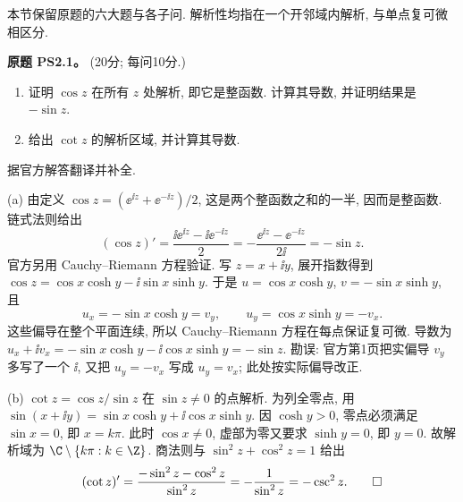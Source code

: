 本节保留原题的六大题与各子问. 解析性均指在一个开邻域内解析, 与单点复可微相区分.

\begin{exercise}\label{ass:ps2-1}
\textbf{原题 PS2.1。} (20分; 每问10分.)
\begin{enumerate}[label=(\alph*)]
\item 证明 $\cos z$ 在所有 $z$ 处解析, 即它是整函数. 计算其导数, 并证明结果是 $-\sin z$.
\item 给出 $\cot z$ 的解析区域, 并计算其导数.
\end{enumerate}
\end{exercise}
\begin{solution}
据官方解答翻译并补全.

(a) 由定义 $\cos z=(\ee^{\ii z}+\ee^{-\ii z})/2$, 这是两个整函数之和的一半, 因而是整函数. 链式法则给出
\[
 (\cos z)'=\frac{\ii\ee^{\ii z}-\ii\ee^{-\ii z}}2
 =-\frac{\ee^{\ii z}-\ee^{-\ii z}}{2\ii}=-\sin z.
\]
官方另用 Cauchy--Riemann 方程验证. 写 $z=x+\ii y$, 展开指数得到
$\cos z=\cos x\cosh y-\ii\sin x\sinh y$.
于是 $u=\cos x\cosh y$, $v=-\sin x\sinh y$, 且
\[
 u_x=-\sin x\cosh y=v_y,\qquad
 u_y=\cos x\sinh y=-v_x.
\]
这些偏导在整个平面连续, 所以 Cauchy--Riemann 方程在每点保证复可微. 导数为
$u_x+\ii v_x=-\sin x\cosh y-\ii\cos x\sinh y=-\sin z$.
勘误: 官方第1页把实偏导 $v_y$ 多写了一个 $\ii$, 又把 $u_y=-v_x$ 写成 $u_y=v_x$; 此处按实际偏导改正.

(b) $\cot z=\cos z/\sin z$ 在 $\sin z\ne0$ 的点解析. 为列全零点, 用
$\sin(x+\ii y)=\sin x\cosh y+\ii\cos x\sinh y$.
因 $\cosh y>0$, 零点必须满足 $\sin x=0$, 即 $x=k\pi$. 此时 $\cos x\ne0$, 虚部为零又要求 $\sinh y=0$, 即 $y=0$. 故解析域为 $\C\setminus\{k\pi:k\in\Z\}$.
商法则与 $\sin^2z+\cos^2z=1$ 给出
\[
 (\cot z)'=\frac{-\sin^2z-\cos^2z}{\sin^2z}
 =-\frac1{\sin^2z}=-\csc^2z.\qedhere
\]
\end{solution}

